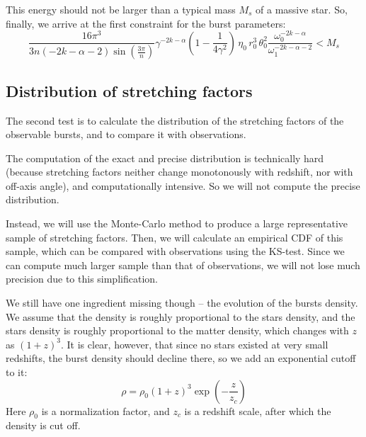 \documentclass{article}
\begin{document}
This energy should not be larger than a typical mass $M_s$ of a massive star. So, finally, we arrive at the first constraint for the burst parameters:
\begin{equation}
\frac{16\pi^3}{3 n\left(-2k-\alpha-2\right)\sin\left(\frac{3\pi}{n}\right)} \gamma^{-2k-\alpha} \left(1 - \frac{1}{4\gamma^2}\right) \, \eta_0 \, r_0^3 \, \theta_0^2 \frac{\omega_0^{-2k-\alpha}}{\omega_1^{-2k-\alpha-2}} < M_s
\end{equation}

\subsection{Distribution of stretching factors}
\label{sec:distribution}

The second test is to calculate the distribution of the stretching factors of the observable bursts, and to compare it with observations.

The computation of the exact and precise distribution is technically hard (because stretching factors neither change monotonously with redshift, nor with off-axis angle), and computationally intensive. So we will not compute the precise distribution.

Instead, we will use the Monte-Carlo method to produce a large representative sample of stretching factors. Then, we will calculate an empirical CDF of this sample, which can be compared with observations using the KS-test. Since we can compute much larger sample than that of observations, we will not lose much precision due to this simplification.

We still have one ingredient missing though -- the evolution of the bursts density. We assume that the density is roughly proportional to the stars density, and the stars density is roughly proportional to the matter density, which changes with $z$ as $\left(1+z\right)^3$. It is clear, however, that since no stars existed at very small redshifts, the burst density should decline there, so we add an exponential cutoff to it:
\begin{equation}
\rho = \rho_0 \left(1+z\right)^3 \exp\left(-\frac{z}{z_c}\right)
\end{equation}
Here $\rho_0$ is a normalization factor, and $z_c$ is a redshift scale, after which the density is cut off.
\end{document}

